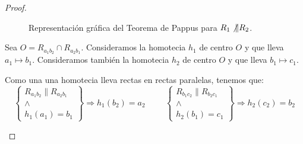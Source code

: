 \begin{proof}
\begin{enumerate}
\begin{figure}[H]
            \caption{Representación gráfica del Teorema de Pappus para $R_1\not\|R_2$.}
        \end{figure}
        
        Sea $O=R_{a_1b_2}\cap R_{a_2b_1}$. Consideramos la homotecia $h_1$ de centro $O$ y que lleva $a_1\mapsto b_1$.
        Consideramos también la homotecia $h_2$ de centro $O$ y que lleva $b_1\mapsto c_1$.

        Como una una homotecia lleva rectas en rectas paralelas, tenemos que:
        \begin{equation*}
            \left\{
                \begin{array}{c}
                    R_{a_1b_2} \| R_{a_2b_1} \\
                    \land \\
                    h_1(a_1) = b_1
                \end{array}
            \right\} \Longrightarrow h_1(b_2)=a_2
            \hspace{1cm}
            \left\{
                \begin{array}{c}
                    R_{b_1c_2} \| R_{b_2c_1} \\
                    \land \\
                    h_2(b_1) = c_1
                \end{array}
            \right\} \Longrightarrow h_2(c_2)=b_2
        \end{equation*}


\end{enumerate}
\end{proof}
